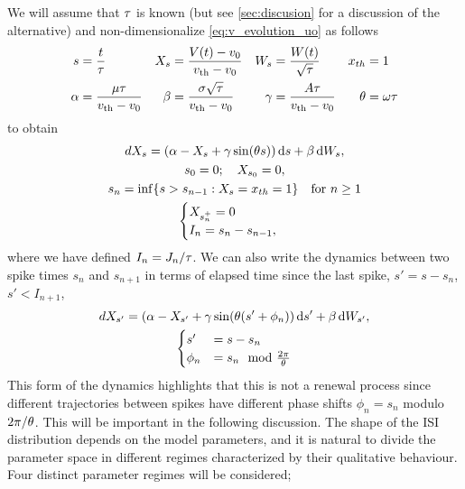 We will assume that ${\tau}$ is known (but see \cref{sec:discusion} for a discussion
of the alternative) and non-dimensionalize \cref{eq:v_evolution_uo} as follows
\begin{align*}
s &= \frac{t}{{\tau}}	& 
X_s &= \frac{V(t) - v_0}{{ v_{\textrm{th} } } - v_0}&
W_s &= \frac{W(t)}{\sqrt {{\tau}}}	&
{ x_{th} }&= 1
\\
\alpha &= \frac{{\mu } {\tau}}{{ v_{\textrm{th} } } - v_0}	&
\beta &= \frac{\sigma\sqrt{{\tau}}}{{ v_{\textrm{th} } }-v_0}	&
{\gamma } &= \frac{A {\tau}}{ { v_{\textrm{th} } } - v_0 }	&
{ \theta} &= {\omega} {\tau} \notag
\end{align*}
to obtain
\begin{equation}
\begin{gathered}
dX_s = (\alpha - X_s + {\gamma } \sin( { \theta} s ) ) \, \mathrm{d} s + \beta \, \mathrm{d} W_s,
\\
s_0 = 0; \quad X_{s_0} = 0,
\\
s_{n } = \inf \{ s > s_{n-1} : X_s = { x_{th} } =1 \} \quad \text{for } n \geq 1 
\\
\begin{cases}
X_{s_n^+} = 0 &  
\\
I_n = s_n-s_{n-1} ,
\end{cases}
\end{gathered}
\label{eq:X_evolution_uo}
\end{equation}
where we have defined $I_n = J_n / {\tau}$. We can also write the dynamics between two spike times $s_n$ and $s_{n+1}$ in terms of elapsed time since
the last spike, $s' = s- s_n$, $s' < I_{n+1}$,
\begin{equation}
\begin{gathered}
dX_{s'} = (\alpha - X_{s'} + {\gamma } \sin( { \theta} (s' + \phi_n ) ) \, \mathrm{d} s' + \beta
\, \mathrm{d} W_{s'},
\\
\begin{cases}
s' &= s - s_n
\\
 \phi_n &= s_n \mod \tfrac{2 \pi}{{ \theta}}
\end{cases}
\end{gathered}
\label{eq:X_evolution_uo_renewal}
\end{equation}
This form of the dynamics highlights that this is not a renewal process since
different trajectories between spikes have different phase shifts $\phi_n = s_n$
modulo ${2 \pi}/{{ \theta}}$. This will be important in the following discussion. The
shape of the ISI distribution depends on the model parameters, and it is natural
to divide the parameter space in different regimes characterized by their
qualitative behaviour. Four distinct parameter regimes will be considered;
